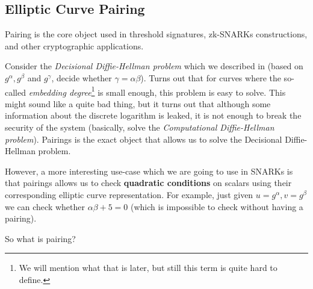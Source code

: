 \documentclass[../../book.tex]{subfiles}
\begin{document}
\vspace{-0.15mm}

\subsection{Elliptic Curve Pairing}\label{section:ecpairing}

\vspace{-0.15mm}

Pairing is the core object used in threshold signatures, zk-SNARKs
constructions, and other cryptographic applications. 

Consider the \textit{Decisional Diffie-Hellman problem} which we described in  
(based on $g^{\alpha},g^{\beta}$ and $g^{\gamma}$, decide whether $\gamma = \alpha\beta$). Turns out that for curves 
where the so-called \textit{embedding degree}\footnote{We will mention what that is later, but still this term is 
quite hard to define.} is small enough, this problem is easy to solve. This might sound like a quite bad thing, but 
it turns out that although some information about the discrete logarithm is leaked, it is not enough to break the 
security of the system (basically, solve the \textit{Computational Diffie-Hellman problem}). Pairings is the exact 
object that allows us to solve the Decisional Diffie-Hellman problem.

However, a more interesting use-case which we are going to use in SNARKs is that pairings allows us to check 
\textbf{quadratic conditions} on scalars using their corresponding elliptic curve representation. For example, 
just given $u=g^{\alpha},v=g^{\beta}$ we can check whether $\alpha\beta+5=0$ (which is impossible to check without 
having a pairing). 

So what is pairing?
\end{document}
